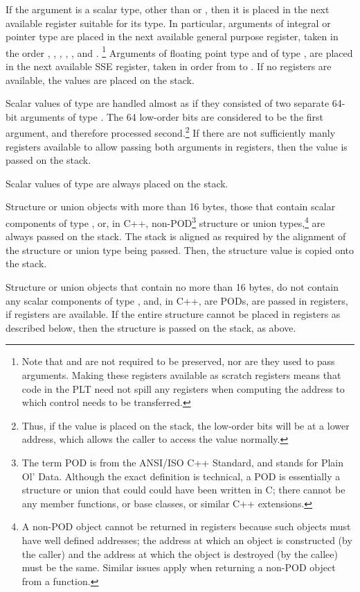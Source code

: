 If the argument is a scalar type, other than  or
, then it is placed in the next available register
suitable for its type.  In particular, arguments of integral or
pointer type are placed in the next available general purpose
register, taken in the order \RBX, \RCX, \RDX, \RSI, \RDI, and .
\footnote{Note that \RAX and  are not required to be
  preserved, nor are they used to pass arguments.  Making these
  registers available as scratch registers means that code in the PLT
  need not spill any registers when computing the address to which
  control needs to be transferred.}  Arguments of floating point type
and of type , are placed in the next available SSE
register, taken in order from  to .  If no
registers are available, the values are placed on the stack.

Scalar values of type  are handled almost as if they
consisted of two separate 64-bit arguments of type .  The
64 low-order bits are considered to be the first argument, and
therefore processed second.\footnote{Thus, if the value is placed on
  the stack, the low-order bits will be at a lower address, which
  allows the caller to access the value normally.}  If there are not
sufficiently manly registers available to allow passing both arguments
in registers, then the value is passed on the stack.

Scalar values of type  are always placed on the stack.

Structure or union objects with more than 16 bytes, those that contain
scalar components of type , or, in C++,
non-POD\footnote{The term POD is from the ANSI/ISO C++ Standard, and
  stands for Plain Ol' Data.  Although the exact definition is
  technical, a POD is essentially a structure or union that could
  could have been written in C; there cannot be any member functions,
  or base classes, or similar C++ extensions.}  structure or union
types,\footnote{A non-POD object cannot be returned in registers
  because such objects must have well defined addresses; the address
  at which an object is constructed (by the caller) and the address at
  which the object is destroyed (by the callee) must be the same.
  Similar issues apply when returning a non-POD object from a
  function.} are always passed on the stack.  The stack is aligned as
required by the alignment of the structure or union type being passed.
Then, the structure value is copied onto the stack.

Structure or union objects that contain no more than 16 bytes, do not
contain any scalar components of type , and, in C++, are
PODs, are passed in registers, if registers are available.  If the
entire structure cannot be placed in registers as described below,
then the structure is passed on the stack, as above.  

